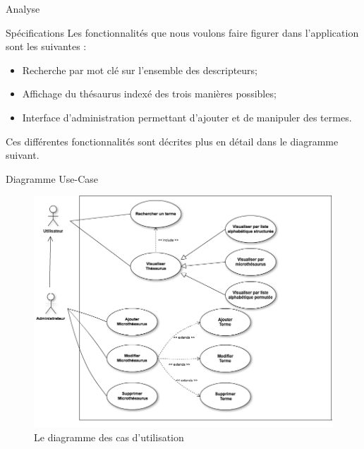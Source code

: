\documentclass[a4paper, 12pt]{report}
\begin{document}
\begin{chapter}{Analyse}
	\begin{section}{Spécifications}
		Les fonctionnalités que nous voulons faire figurer dans l'application sont les suivantes :
		\begin{itemize}
			\item Recherche par mot clé sur l'ensemble des descripteurs;
			\item Affichage du thésaurus indexé des trois manières possibles;
			\item Interface d'administration permettant d'ajouter et de manipuler des termes.
		\end{itemize}
		
		Ces différentes fonctionnalités sont décrites plus en détail dans le diagramme suivant.
	\end{section}
	\begin{section}{Diagramme Use-Case}\label{re}
		\begin{figure}[h]
			\label{sucresale}
			\begin{center}
				\includegraphics[width=12cm]{Use-Case.png}
				\caption{Le diagramme des cas d'utilisation}
			\end{center}
		\end{figure}~\\
		

\end{section}
\end{chapter}
\end{document}
